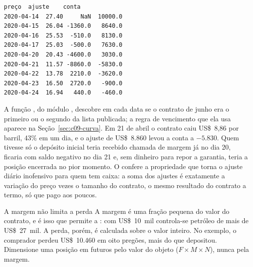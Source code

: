 
\begin{lstlisting}[style=saida]
            preço  ajuste    conta
2020-04-14  27.40     NaN  10000.0
2020-04-15  26.04 -1360.0   8640.0
2020-04-16  25.53  -510.0   8130.0
2020-04-17  25.03  -500.0   7630.0
2020-04-20  20.43 -4600.0   3030.0
2020-04-21  11.57 -8860.0  -5830.0
2020-04-22  13.78  2210.0  -3620.0
2020-04-23  16.50  2720.0   -900.0
2020-04-24  16.94   440.0   -460.0
\end{lstlisting}

A função , do módulo , descobre em cada data se o contrato de junho era o primeiro ou o segundo da lista publicada; a regra de vencimento que ela usa aparece na Seção~\ref{sec:c09-curva}. Em 21 de abril o contrato caiu US\$~8,86 por barril, 43\% em um dia, e o ajuste de US\$~8.860 levou a conta a $-5.830$. Quem tivesse só o depósito inicial teria recebido chamada de margem já no dia 20, ficaria com saldo negativo no dia 21 e, sem dinheiro para repor a garantia, teria a posição encerrada no pior momento. O  confere a propriedade que torna o ajuste diário inofensivo para quem tem caixa: a soma dos ajustes é exatamente a variação do preço vezes o tamanho do contrato, o mesmo resultado do contrato a termo, só que pago aos poucos.

\begin{armadilha}{A margem não limita a perda}
A margem é uma fração pequena do valor do contrato, e é isso que permite a : com US\$~10~mil controla-se petróleo de mais de US\$~27~mil. A perda, porém, é calculada sobre o valor inteiro. No exemplo, o comprador perdeu US\$~10.460 em oito pregões, mais do que depositou. Dimensione uma posição em futuros pelo valor do objeto ($F \times M \times N$), nunca pela margem.
\end{armadilha}

